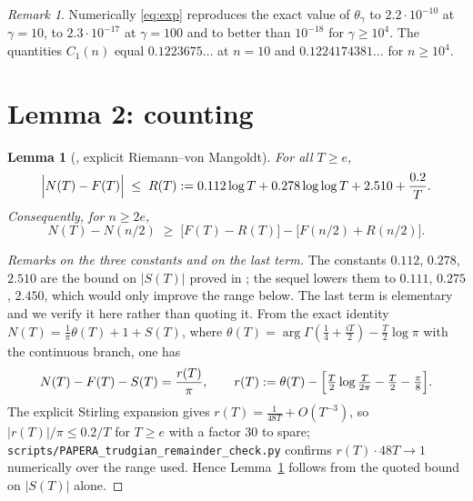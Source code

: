 \documentclass[11pt]{article}
\newtheorem{lemma}[theorem]{Lemma}
\theoremstyle{remark}
\newtheorem{remark}[theorem]{Remark}
\begin{document}
\begin{remark}
Numerically \eqref{eq:exp} reproduces the exact value of $\theta_\gamma$ to $2.2\cdot10^{-10}$
at $\gamma=10$, to $2.3\cdot10^{-17}$ at $\gamma=100$ and to better than $10^{-18}$ for
$\gamma\ge10^{4}$. The quantities $C_1(n)$ equal $0.1223675\ldots$ at $n=10$ and
$0.1224174381\ldots$ for $n\ge10^{4}$.
\end{remark}

\section{Lemma 2: counting}
\begin{lemma}[{\cite[Thm.~1]{Trudgian}, explicit Riemann--von Mangoldt}]\label{lem:count}
For all $T\ge e$,
\[
  \Bigl|N(T)-F(T)\Bigr|\;\le\;R(T):=0.112\log T+0.278\log\log T+2.510+\frac{0.2}{T}.
\]
Consequently, for $n\ge 2e$,
\[
  N(T)-N(n/2)\;\ge\;\bigl[F(T)-R(T)\bigr]-\bigl[F(n/2)+R(n/2)\bigr].
\]
\end{lemma}

\begin{proof}[Remarks on the three constants and on the last term]
The constants $0.112$, $0.278$, $2.510$ are the bound on $|S(T)|$ proved in \cite[Thm.~1]{Trudgian}; the
sequel \cite{TrudgianII} lowers them to $0.111$, $0.275$, $2.450$, which would only improve the range below.
The last term is elementary and we verify it here rather than quoting it. From the exact identity
$N(T)=\tfrac1\pi\theta(T)+1+S(T)$, where $\theta(T)=\arg\Gamma(\tfrac14+\tfrac{iT}2)-\tfrac T2\log\pi$ with the
continuous branch, one has
\[
  N(T)-F(T)-S(T)=\frac{r(T)}{\pi},\qquad
  r(T):=\theta(T)-\Bigl[\tfrac T2\log\tfrac{T}{2\pi}-\tfrac T2-\tfrac\pi8\Bigr].
\]
The explicit Stirling expansion gives $r(T)=\tfrac1{48T}+O(T^{-3})$, so $|r(T)|/\pi\le 0.2/T$ for $T\ge e$ with
a factor $30$ to spare; \texttt{scripts/PAPERA\_trudgian\_remainder\_check.py} confirms $r(T)\cdot48T\to1$
numerically over the range used. Hence Lemma~\ref{lem:count} follows from the quoted bound on $|S(T)|$ alone.
\end{proof}
\end{document}
